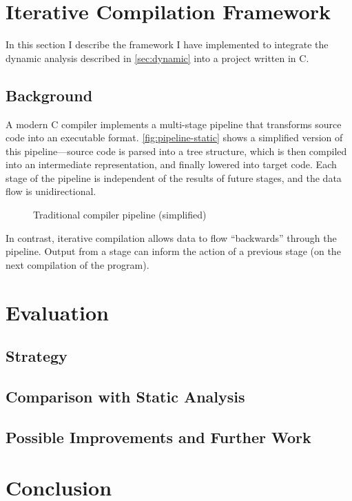 \documentclass[journal]{IEEEtran}
\begin{document}
\section{Iterative Compilation Framework} \label{sec:iter}

In this section I describe the framework I have implemented to integrate the
dynamic analysis described in \autoref{sec:dynamic} into a project written in C.

\subsection{Background}

A modern C compiler implements a multi-stage pipeline that transforms source
code into an executable format. \autoref{fig:pipeline-static} shows a simplified
version of this pipeline---source code is parsed into a tree structure, which is
then compiled into an intermediate representation, and finally lowered into
target code. Each stage of the pipeline is independent of the results of future
stages, and the data flow is unidirectional.

\begin{figure}[h] 
  \centering 
  \caption{Traditional compiler pipeline (simplified)} 
  \label{fig:pipeline-static}
\end{figure}

In contrast, iterative compilation allows data to flow ``backwards'' through the
pipeline. Output from a stage can inform the action of a previous stage (on the
next compilation of the program).

\section{Evaluation} \label{sec:eval}

\subsection{Strategy}

\subsection{Comparison with Static Analysis} \label{ssec:compare}

\subsection{Possible Improvements and Further Work}

\section{Conclusion}

\ifCLASSOPTIONcaptionsoff
  \newpage
\fi

\printbibliography
\end{document}
